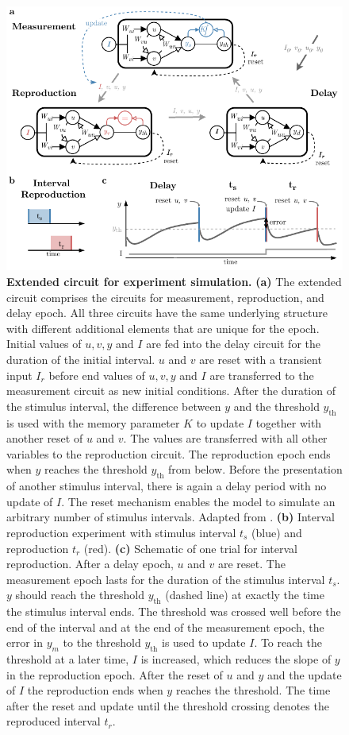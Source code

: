 \documentclass[10pt, a4paper]{article}
\begin{document}
\begin{figure}
	\centering
	\includegraphics{figures/epochs.pdf}
	\caption{\textbf{Extended circuit for experiment simulation.} 
	\textbf{(a)} The extended circuit comprises the circuits for measurement, reproduction, and delay epoch. All three circuits have the same underlying structure with different additional elements that are unique for the epoch. Initial values of $u, v, y$ and $I$ are fed into the delay circuit for the duration of the initial interval. $u$ and $v$ are reset with a transient input $I_r$ before end values of $u, v, y$ and $I$ are transferred to the measurement circuit as new initial conditions. After the duration of the stimulus interval, the difference between $y$ and the threshold $y_{\text{th}}$ is used with the memory parameter $K$ to update $I$ together with another reset of $u$ and $v$. The values are transferred with all other variables to the reproduction circuit. The reproduction epoch ends when $y$ reaches the threshold $y_{\text{th}}$ from below. Before the presentation of another stimulus interval, there is again a delay period with no update of $I$. The reset mechanism enables the model to simulate an arbitrary number of stimulus intervals. Adapted from \cite{Egger2020}.
	\textbf{(b)} Interval reproduction experiment with stimulus interval $t_s$ (blue) and reproduction $t_r$ (red).
	\textbf{(c)} Schematic of one trial for interval reproduction. After a delay epoch, $u$ and $v$ are reset. The measurement epoch lasts for the duration of the stimulus interval $t_s$. $y$ should reach the threshold $y_{\text{th}}$ (dashed line) at exactly the time the stimulus interval ends. The threshold was crossed well before the end of the interval and at the end of the measurement epoch, the error in $y_m$ to the threshold $y_{\text{th}}$ is used to update $I$. To reach the threshold at a later time, $I$ is increased, which reduces the slope of $y$ in the reproduction epoch. After the reset of $u$ and $y$ and the update of $I$ the reproduction ends when $y$ reaches the threshold. The time after the reset and update until the threshold crossing denotes the reproduced interval $t_r$.}
\label{fig:epochs}
\end{figure}
\end{document}
